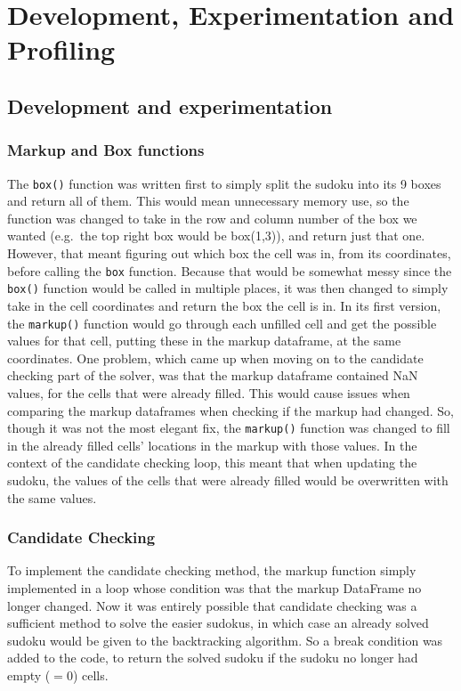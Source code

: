 \documentclass[12pt]{report} %
\begin{document}
\chapter{Development, Experimentation and Profiling}

\section{Development and experimentation}

\subsection{Markup and Box functions}

The \texttt{box()} function was written first to simply split the sudoku into its 9 boxes and return all of them. This would mean unnecessary memory use, so the function was changed to take in the row and column number of the box we wanted (e.g.\ the top right box would be box(1,3)), and return just that one. However, that meant figuring out which box the cell was in, from its coordinates, before calling the \texttt{box} function. Because that would be somewhat messy since the \texttt{box()} function would be called in multiple places, it was then changed to simply take in the cell coordinates and return the box the cell is in.
In its first version, the \texttt{markup()} function would go through each unfilled cell and get the possible values for that cell, putting these in the markup dataframe, at the same coordinates. One problem, which came up when moving on to the candidate checking part of the solver, was that the markup dataframe contained NaN values, for the cells that were already filled. This would cause issues when comparing the markup dataframes when checking if the markup had changed. So, though it was not the most elegant fix, the \texttt{markup()} function was changed to fill in the already filled cells' locations in the markup with those values. In the context of the candidate checking loop, this meant that when updating the sudoku, the values of the cells that were already filled would be overwritten with the same values.

\subsection{Candidate Checking}
To implement the candidate checking method, the markup function simply implemented in a loop whose condition was that the markup DataFrame no longer changed. Now it was entirely possible that candidate checking was a sufficient method to solve the easier sudokus, in which case an already solved sudoku would be given to the backtracking algorithm. So a break condition was added to the code, to return the solved sudoku if the sudoku no longer had empty ($=0$) cells.
\end{document}
